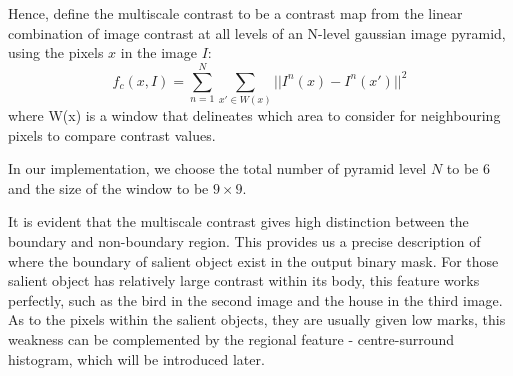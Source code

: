 \documentclass[10pt,twocolumn,letterpaper]{article}
\newcommand{\SUM}{\sum\limits}
\begin{document}
Hence, define the multiscale contrast to be a contrast map from the linear combination of image contrast at all levels of an N-level
gaussian image pyramid, using the pixels $x$ in the image $I$: $$f_c(x,I) = \SUM_{n = 1}^{N}\SUM_{x'\in W(x)}||I^n(x)-I^n(x')||^2$$ where W(x) is a window that delineates which area to consider for neighbouring pixels to compare contrast values.

In our implementation, we choose the total number of pyramid level $N$ to be $6$ and the size of the window to be $9 \times 9$. 

It is evident that the multiscale contrast gives high distinction between the boundary and non-boundary region. This provides us a precise description of where the boundary of salient object exist in the output binary mask. For those salient object has relatively large contrast within its body, this feature works perfectly, such as the bird in the second image and the house in the third image. As to the pixels within the salient objects, they are usually given low marks, this weakness can be complemented by the regional feature - centre-surround histogram, which will be introduced later.
\end{document}
